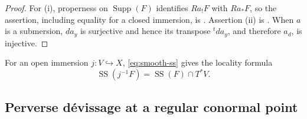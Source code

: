 \documentclass[10pt]{amsart}
\numberwithin{equation}{section}
\theoremstyle{plain}
\theoremstyle{definition}
\theoremstyle{remark}
\newcommand{\SSupp}{\operatorname{SS}}
\begin{document}
\begin{proof}
For \textup{(i)}, properness on $\operatorname{Supp}(F)$ identifies
$Ra_!F$ with $Ra_*F$, so the assertion, including equality for a closed
immersion, is \cite[Proposition~4.1.1(i),(ii)]{KS85}.  Assertion
\textup{(ii)} is \cite[Proposition~4.1.2(i)]{KS85}.
When $a$ is a submersion, $da_y$ is surjective and hence its transpose
${}^tda_y$, and therefore $a_d$, is injective.
\end{proof}

For an open immersion $j:V\hookrightarrow X$, \eqref{eq:smooth-ss} gives the locality formula
\begin{equation}\label{eq:locality}
  \SSupp(j^{-1}F)=\SSupp(F)\cap T^*V.
\end{equation}

\subsection{Perverse d\'evissage at a regular conormal point}
\end{document}
